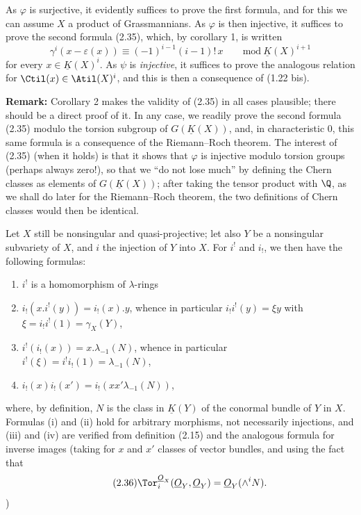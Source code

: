 As $\varphi$ is surjective, it evidently suffices to prove the first formula, and for this we can assume $X$ a product of Grassmannians. As $\varphi$ is then injective, it suffices to prove the second formula (2.35), which, by corollary 1, is written
\[
 \gamma^i(x-\varepsilon(x))\equiv(-1)^{i-1}(i-1)!\,x\qquad\mathrm{mod}\ \underline K(X)^{i+1}
\]
for every $x\in\underline K(X)^i$. As $\psi$ is \emph{injective}, it suffices to prove the analogous relation for $\Ctil(x)\in\Atil(X)^i$, and this is then a consequence of (1.22 bis).

\textbf{Remark:} Corollary 2 makes the validity of (2.35) in all cases plausible; there should be a direct proof of it. In
%
any case, we readily prove the second formula (2.35) modulo the torsion subgroup of $G(\underline K(X))$, and, in characteristic $0$, this same formula is a consequence of the Riemann--Roch theorem. The interest of (2.35) (when it holds) is that it shows that $\varphi$ is injective modulo torsion groups (perhaps always zero!), so that we ``do not lose much'' by defining the Chern classes as elements of $G(\underline K(X))$; after taking the tensor product with $\Q$, as we shall do later for the Riemann--Roch theorem, the two definitions of Chern classes would then be identical.

Let $X$ still be nonsingular and quasi-projective; let also $Y$ be a nonsingular subvariety of $X$, and $i$ the injection of $Y$ into $X$. For $i^!$ and $i_!$, we then have the following formulas:
\begin{enumerate}[label=(\roman*)]
\item $i^!$ is a homomorphism of $\lambda$-rings
\item $i_!(x.i^!(y))=i_!(x).y$, whence in particular $i_!i^!(y)=\xi y$ with $\xi=i_!i^!(1)=\gamma_X(Y)$,
\item $i^!(i_!(x))=x.\lambda_{-1}(N)$, whence in particular $i^!(\xi)=i^!i_!(1)=\lambda_{-1}(N)$,
\item $i_!(x)i_!(x')=i_!(xx'\lambda_{-1}(N))$,
\end{enumerate}
where, by definition, $N$ is the class in $\underline K(Y)$ of the conormal bundle of $Y$ in $X$. Formulas (i) and (ii) hold for arbitrary morphisms, not necessarily injections, and (iii) and (iv) are verified from definition (2.15) and the analogous formula for inverse images (taking for $x$ and $x'$ classes of vector bundles, and using the fact that
\begin{equation}\tag{2.36}
 \Tor^{\underline{O}_X}_i(\underline{O}_Y,\underline{O}_Y)=\underline{O}_Y(\wedge^i N).
\end{equation}
)

